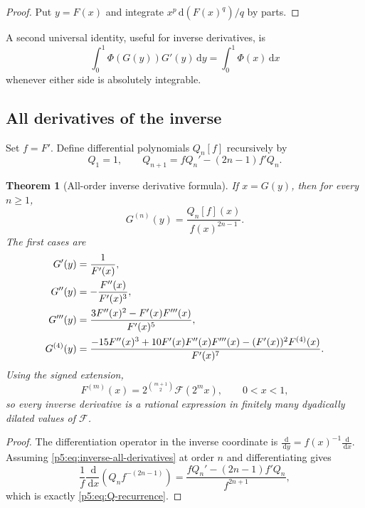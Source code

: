 \documentclass[11pt,oneside]{article}
\newtheorem{theorem}{Theorem}[section]
\theoremstyle{definition}
\theoremstyle{remark}
\newcommand{\dd}{\,\mathrm d}
\newcommand{\1}{\mathbf 1}
\begin{document}
\begin{proof}
Put $y=F(x)$ and integrate $x^p\dd(F(x)^q)/q$ by parts.
\end{proof}

A second universal identity, useful for inverse derivatives, is
\begin{equation}\label{p5:eq:Gprime-pushforward}
 \int_0^1\Phi(G(y))G'(y)\dd y=\int_0^1\Phi(x)\dd x
\end{equation}
whenever either side is absolutely integrable.

\subsection{All derivatives of the inverse}

Set $f=F'$.  Define differential polynomials $Q_n[f]$ recursively by
\begin{equation}\label{p5:eq:Q-recurrence}
 Q_1=1,
 \qquad
 Q_{n+1}=fQ_n'-(2n-1)f'Q_n.
\end{equation}

\begin{theorem}[All-order inverse derivative formula]\label{p5:thm:inverse-all-derivatives}
If $x=G(y)$, then for every $n\ge1$,
\begin{equation}\label{p5:eq:inverse-all-derivatives}
\boxed{
 G^{(n)}(y)=\frac{Q_n[f](x)}{f(x)^{2n-1}}.}
\end{equation}
The first cases are
\begin{align}
 G'(y)&=\frac1{F'(x)},\notag\\
 G''(y)&=-\frac{F''(x)}{F'(x)^3},\notag\\
 G'''(y)&=\frac{3F''(x)^2-F'(x)F'''(x)}{F'(x)^5},\label{p5:eq:inverse-first-derivatives}\\
 G^{(4)}(y)&=\frac{-15F''(x)^3+10F'(x)F''(x)F'''(x)
 -(F'(x))^2F^{(4)}(x)}{F'(x)^7}.
\end{align}
Using the signed extension,
\begin{equation}\label{p5:eq:forward-derivative-dilation}
 F^{(m)}(x)=2^{\binom{m+1}{2}}\mathcal F(2^mx),
 \qquad 0<x<1,
\end{equation}
so every inverse derivative is a rational expression in finitely many dyadically dilated values of $\mathcal F$.
\end{theorem}

\begin{proof}
The differentiation operator in the inverse coordinate is
$\frac{\dd}{\dd y}=f(x)^{-1}\frac{\dd}{\dd x}$.  Assuming \eqref{p5:eq:inverse-all-derivatives} at order $n$ and differentiating gives
\[
 \frac1f\frac{\dd}{\dd x}\left(Q_nf^{-(2n-1)}\right)
 =\frac{fQ_n'-(2n-1)f'Q_n}{f^{2n+1}},
\]
which is exactly \eqref{p5:eq:Q-recurrence}.
\end{proof}
\end{document}
